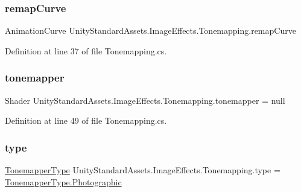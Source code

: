 \subsubsection{\texorpdfstring{remap\+Curve}{remapCurve}}
{\footnotesize\ttfamily Animation\+Curve Unity\+Standard\+Assets.\+Image\+Effects.\+Tonemapping.\+remap\+Curve}



Definition at line 37 of file Tonemapping.\+cs.

\mbox{\label{class_unity_standard_assets_1_1_image_effects_1_1_tonemapping_a81b4dff40a21bcaf1e409b5b2889549f}} 
\subsubsection{\texorpdfstring{tonemapper}{tonemapper}}
{\footnotesize\ttfamily Shader Unity\+Standard\+Assets.\+Image\+Effects.\+Tonemapping.\+tonemapper = null}



Definition at line 49 of file Tonemapping.\+cs.

\mbox{\label{class_unity_standard_assets_1_1_image_effects_1_1_tonemapping_a52e39b9f620d0f6b460858cdc4f38d54}} 
\subsubsection{\texorpdfstring{type}{type}}
{\footnotesize\ttfamily \mbox{\hyperlink{class_unity_standard_assets_1_1_image_effects_1_1_tonemapping_abdf231516a590a7b08ef8503048a3d33}{Tonemapper\+Type}} Unity\+Standard\+Assets.\+Image\+Effects.\+Tonemapping.\+type = \mbox{\hyperlink{class_unity_standard_assets_1_1_image_effects_1_1_tonemapping_abdf231516a590a7b08ef8503048a3d33acf42c2415ddadee23605115458f767b4}{Tonemapper\+Type.\+Photographic}}}



